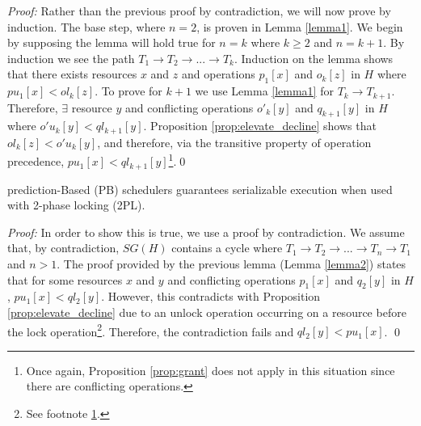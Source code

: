 \textit{Proof:} Rather than the previous proof by contradiction, we will now prove by induction. The base step, where $n = 2$, is proven in Lemma \ref{lemma1}. We begin by supposing the lemma will hold true for $n = k$ where $k \geq 2$ and $n = k + 1$. By induction we see the path $T_{1} \rightarrow T_{2} \rightarrow ... \rightarrow T_{k}$. Induction on the lemma shows that there exists resources $x$ and $z$ and operations $p_{1}[x]$ and $o_{k}[z]$ in $H$ where $pu_{1}[x] < ol_{k}[z]$. To prove for $k + 1$ we use Lemma \ref{lemma1} for $T_{k} \rightarrow T_{k+1}$. Therefore, $\exists$ resource $y$ and conflicting operations $o'_{k}[y]$ and $q_{k+1}[y]$ in $H$ where $o'u_{k}[y] < ql_{k+1}[y]$. Proposition \ref{prop:elevate_decline} shows that $ol_{k}[z] < o'u_{k}[y]$, and therefore, via the transitive property of operation precedence, $pu_{1}[x] < ql_{k+1}[y]$\footnote{\label{note1}Once again, Proposition \ref{prop:grant} does not apply in this situation since there are conflicting operations.}.\qed

\begin{theorem}
\label{theorem1}
prediction-Based (PB) schedulers guarantees serializable execution when used with 2-phase locking (2PL).
\end{theorem}


\textit{Proof:} In order to show this is true, we use a proof by contradiction. We assume that, by contradiction, $SG(H)$ contains a cycle where $T_{1} \rightarrow T_{2} \rightarrow ... \rightarrow T_{n} \rightarrow T_{1}$ and $n > 1$. The proof provided by the previous lemma (Lemma \ref{lemma2}) states that for some resources $x$ and $y$ and conflicting operations $p_{1} [x]$ and $q_{2}[y]$ in $H$, $pu_{1}[x] < ql_{2}[y]$. However, this contradicts with Proposition \ref{prop:elevate_decline} due to an unlock operation occurring on a resource before the lock operation\footnote{See footnote \ref{note1}.}. Therefore, the contradiction fails and $ql_{2}[y] < pu_{1}[x]$. \qed